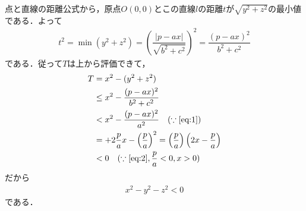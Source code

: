 \documentclass[../../main.tex]{subfiles}
\begin{document}
点と直線の距離公式から，原点$O(0,0)$とこの直線$l$の距離$t$が$\sqrt{y^2+z^2}$の最小値である．よって
\begin{align}
  t^2 = \min (y^2 + z^2) = \left( \dfrac{|p - ax|}{\sqrt{b^2 + c^2}} \right)^2 = \dfrac{(p - ax)^2}{b^2 + c^2}
\end{align}
である．従って$T$は上から評価できて，
\begin{align}
  T &= x^2 - (y^2 + z^2)  \\
  &\le x^2 - \dfrac{(p - ax)^2}{b^2 + c^2} \\
  & < x^2 - \dfrac{(p - ax)^2}{a^2} \quad (\because \text{\cref{eq:1}}) \\
  &= + 2 \dfrac{p}{a} x - \left( \dfrac{p}{a} \right)^2 = \left( \dfrac{p}{a} \right) \left( 2x - \dfrac{p}{a} \right) \\
  &< 0 \quad (\because \text{\cref{eq:2}}, \dfrac{p}{a} < 0, x > 0)
\end{align}
だから
\begin{align}
  x^2 - y^2 - z^2 < 0
\end{align}
である．
\end{document}

